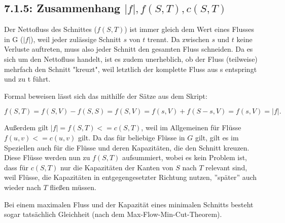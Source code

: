 \subsection*{7.1.5: Zusammenhang $|f|,f(S,T),c(S,T)$}

Der Nettofluss des Schnittes ($f(S, T)$) ist immer gleich dem Wert eines Flusses in G ($|f|$), weil jeder zulässige Schnitt $s$ von $t$ trennt. Da zwischen $s$ und $t$ keine Verluste auftreten, muss also jeder Schnitt den gesamten Fluss schneiden. Da es sich um den Nettofluss handelt, ist es zudem unerheblich, ob der Fluss (teilweise) mehrfach den Schnitt "kreuzt", weil letztlich der komplette Fluss aus s entspringt und zu t führt.

Formal beweisen lässt sich das mithilfe der Sätze aus dem Skript:

$f(S,T) = f(S,V) - f(S,S) = f(S,V) = f(s,V) + f(S-s,V) = f(s,V) = |f|.$


Außerdem gilt $|f| = f(S,T) <= c(S,T)$, weil im Allgemeinen für Flüsse $f(u,v) <= c(u,v)$ gilt. Da das für beliebige Flüsse in $G$ gilt, gilt es im Speziellen auch für die Flüsse und deren Kapazitäten, die den Schnitt kreuzen. \\
Diese Flüsse werden nun zu $f(S,T)$ aufsummiert, wobei es kein Problem ist, dass für $c(S,T)$ nur die Kapazitäten der Kanten von $S$ nach $T$ relevant sind, weil Flüsse, die Kapazitäten in entgegengesetzter Richtung nutzen, ''später'' auch wieder nach $T$ fließen müssen.

Bei einem maximalen Fluss und der Kapazität eines minimalen Schnitts besteht sogar tatsächlich Gleichheit (nach dem Max-Flow-Min-Cut-Theorem).